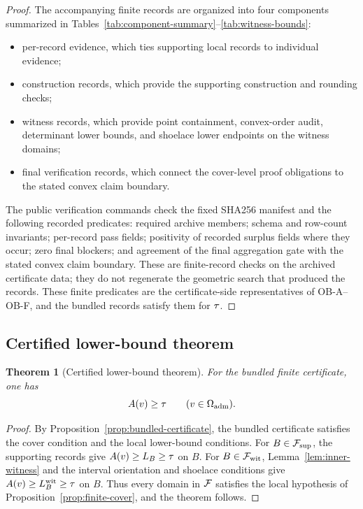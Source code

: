 \documentclass[11pt]{article}
\newtheorem{theorem}{Theorem}
\begin{document}
\begin{proof}
The accompanying finite records are organized into four components summarized in Tables~\ref{tab:component-summary}--\ref{tab:witness-bounds}:
\begin{itemize}
\item per-record evidence, which ties supporting local records to individual evidence;
\item construction records, which provide the supporting construction and rounding checks;
\item witness records, which provide point containment, convex-order audit, determinant lower bounds, and shoelace lower endpoints on the witness domains;
\item final verification records, which connect the cover-level proof obligations to the stated convex claim boundary.
\end{itemize}
The public verification commands check the fixed SHA256 manifest and the following recorded predicates: required archive members; schema and row-count invariants; per-record pass fields; positivity of recorded surplus fields where they occur; zero final blockers; and agreement of the final aggregation gate with the stated convex claim boundary.  These are finite-record checks on the archived certificate data; they do not regenerate the geometric search that produced the records.  These finite predicates are the certificate-side representatives of OB-A--OB-F, and the bundled records satisfy them for \(\tau\).
\end{proof}

\subsection{Certified lower-bound theorem}

\begin{theorem}[Certified lower-bound theorem]\label{thm:certificate}
For the bundled finite certificate, one has
\[
A(v)\ge\tau
\qquad(v\in\Omega_{\mathrm{adm}}).
\]
\end{theorem}

\begin{proof}
By Proposition~\ref{prop:bundled-certificate}, the bundled certificate satisfies the cover condition and the local lower-bound conditions.  For \(B\in\mathcal{F}_{\mathrm{sup}}\), the supporting records give \(A(v)\ge L_B\ge\tau\) on \(B\).  For \(B\in\mathcal{F}_{\mathrm{wit}}\), Lemma~\ref{lem:inner-witness} and the interval orientation and shoelace conditions give \(A(v)\ge L_B^{\mathrm{wit}}\ge\tau\) on \(B\).  Thus every domain in \(\mathcal{F}\) satisfies the local hypothesis of Proposition~\ref{prop:finite-cover}, and the theorem follows.
\end{proof}
\end{document}
